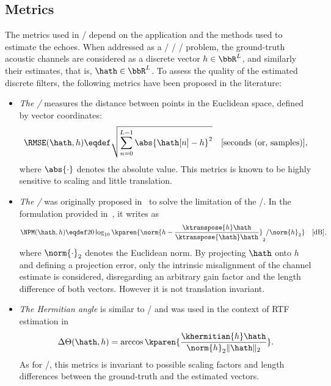 \subsection{Metrics}
The metrics used in \AER/ depend on the application and the methods used to estimate the echoes.
When addressed as a \FIR/ \SIMO/ \BCE/ problem, the ground-truth acoustic channels are considered as a discrete vector $h \in \bbR^L$, and similarly their estimates, that is, $\hath \in \bbR^L$.
To assess the quality of the estimated discrete filters, the following metrics have been proposed in the literature:
\begin{itemize}
    \item \textit{The \RMSEtxt/}  measures the distance between points in the Euclidean space, defined by vector coordinates:
    \begin{equation}
        \RMSE(\hath, h) \eqdef \sqrt{\sum_{n=0}^{L-1} \abs{\hath[n] - h}^2} \quad \text{[seconds (or, samples)]}
        ,
    \end{equation}
    where $\abs{\cdot}$ denotes the absolute value.
    This metrics is known to be highly sensitive to scaling and little translation.

    \item \textit{The \NPMtxt/}  was originally proposed in~ to solve the limitation of the \RMSEtxt/.
    In the formulation provided in~, it writes as
    \begin{equation}
        \NPM(\hath,h) \eqdef 20 \log_{10} \kparen{ \norm{h - \frac{\ktranspose{h}\hath}{\ktranspose{\hath} \hath}}_2 / \norm{h}_2} \quad \text{[dB]}
        ,
    \end{equation}
    where $\norm{\cdot}_2$ denotes the Euclidean norm.
    By projecting $\hath$ onto $h$ and defining a projection error, only the intrinsic misalignment of the channel estimate is considered, disregarding an arbitrary gain factor and the length difference of both vectors.
    However it is not translation invariant.

    \item \textit{The Hermitian angle} is similar to \NPMtxt/ and was used in the context of RTF estimation in~
    \begin{equation}
        \Delta\Theta(\hath,h) = \arccos\kparen{\frac{\khermitian{h}\hath}{\norm{h}_2\|\hath\|_2}}
        .
    \end{equation}
    As for \NPMtxt/, this metrics is invariant to possible scaling factors and length differences between the ground-truth and the estimated vectors.
\end{itemize}


